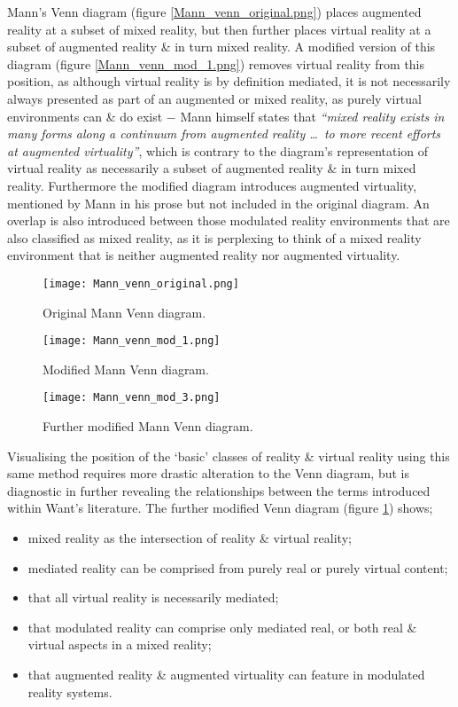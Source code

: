 Mann's Venn diagram (figure \ref{Mann_venn_original.png}) places augmented reality at a subset of mixed reality, but then further places virtual reality at a subset of augmented reality \& in turn mixed reality. A modified version of this diagram (figure \ref{Mann_venn_mod_1.png}) removes virtual reality from this position, as although virtual reality is by definition mediated, it is not necessarily always presented as part of an augmented or mixed reality, as purely virtual environments can \& do exist $-$ Mann himself states that \textit{``mixed reality exists in many forms along a continuum from augmented reality \ldots\ to more recent efforts at augmented virtuality''}, which is contrary to the diagram's representation of virtual reality as necessarily a subset of augmented reality \& in turn mixed reality. Furthermore the modified diagram introduces augmented virtuality, mentioned by Mann in his prose but not included in the original diagram. An overlap is also introduced between those modulated reality environments that are also classified as mixed reality, as it is perplexing to think of a mixed reality environment that is neither augmented reality nor augmented virtuality.

\begin{figure}[h]
\centering
\begin{minipage}{.5\textwidth}
  \centering
  \texttt{[image: Mann\_venn\_original.png]}
  \caption{Original Mann Venn diagram.}
  \label{Mann_venn_original.png}
\end{minipage}%
\begin{minipage}{.5\textwidth}
  \centering
  \texttt{[image: Mann\_venn\_mod\_1.png]}
    \caption{Modified Mann Venn diagram.}
    \label{Mann_venn_mod_1.png}
\end{minipage}

\vspace{5mm}

\centering
  \texttt{[image: Mann\_venn\_mod\_3.png]}
  \caption{Further modified Mann Venn diagram.}
  \label{Mann_venn_mod_3.png}
\end{figure}

Visualising the position of the `basic' classes of reality \& virtual reality using this same method requires more drastic alteration to the Venn diagram, but is diagnostic in further revealing the relationships between the terms introduced within Want's literature. The further modified Venn diagram (figure \ref{Mann_venn_mod_3.png}) shows;
\begin{itemize}
	\item mixed reality as the intersection of reality \& virtual reality;
	\item mediated reality can be comprised from purely real or purely virtual content;
	\item that all virtual reality is necessarily mediated;
	\item that modulated reality can comprise only mediated real, or both real \& virtual aspects in a mixed reality;
	\item that augmented reality \& augmented virtuality can feature in modulated reality systems.
\end{itemize}

